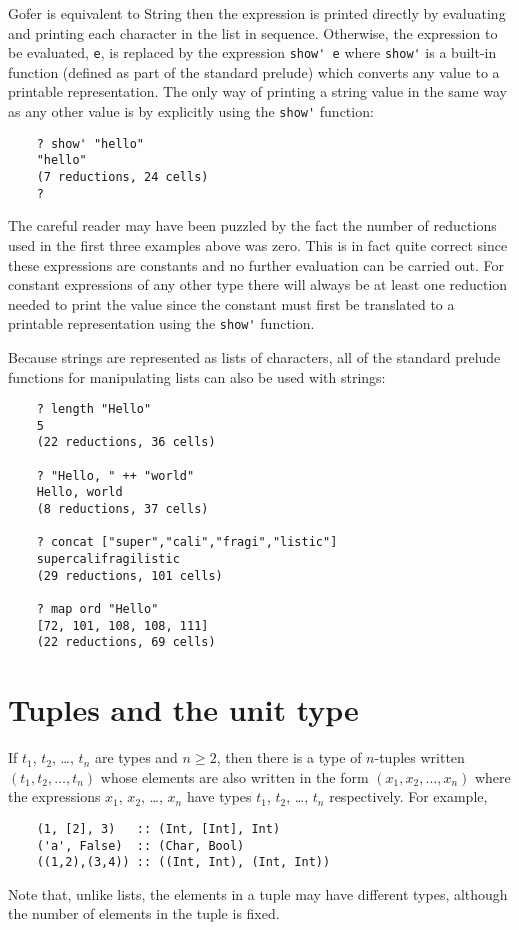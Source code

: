 Gofer is equivalent to String then the expression is  printed  directly
by evaluating and printing each character  in  the  list  in  sequence.
Otherwise, the expression to  be  evaluated,  \verb"e",  is  replaced  by  the
expression \verb"show' e" where \verb"show'"
is a built-in function (defined as  part
of the standard prelude)  which  converts  any  value  to  a  printable
representation.  The  only way of printing a  string value  in the same
way as any other value is by explicitly using the \verb"show'" function:
\begin{verbatim}
    ? show' "hello"
    "hello"
    (7 reductions, 24 cells)
    ?
\end{verbatim}
The careful reader may have been puzzled by  the  fact  the  number  of
reductions used in the first three examples above was zero.  This is in
fact quite correct since these expressions are constants and no further
evaluation can be carried out.  For constant expressions of  any  other
type there will always be at least one reduction needed  to  print  the
value since the constant  must  first  be  translated  to  a  printable
representation using the \verb"show'" function.

Because strings are represented as lists  of  characters,  all  of  the
standard prelude functions for manipulating lists can also be used with
strings:
\begin{verbatim}
    ? length "Hello"
    5
    (22 reductions, 36 cells)

    ? "Hello, " ++ "world"
    Hello, world
    (8 reductions, 37 cells)

    ? concat ["super","cali","fragi","listic"]
    supercalifragilistic
    (29 reductions, 101 cells)

    ? map ord "Hello"
    [72, 101, 108, 108, 111]
    (22 reductions, 69 cells)
\end{verbatim}

\section{Tuples and the unit type}
If $t_1$, $t_2$, \dots, $t_n$ are types and $n\geq 2$,
then there is a type of $n$-tuples
written $(t_1, t_2, \dots, t_n)$ whose elements are also written in  the  form
$(x_1, x_2, \dots, x_n)$ where the expressions $x_1$, $x_2$, \dots, $x_n$
have types  $t_1$,
$t_2$, \dots, $t_n$ respectively. For example,
\begin{verbatim}
    (1, [2], 3)   :: (Int, [Int], Int)
    ('a', False)  :: (Char, Bool)
    ((1,2),(3,4)) :: ((Int, Int), (Int, Int))
\end{verbatim}
Note that, unlike lists, the elements in a  tuple  may  have  different
types, although the number of elements in the tuple is fixed.

